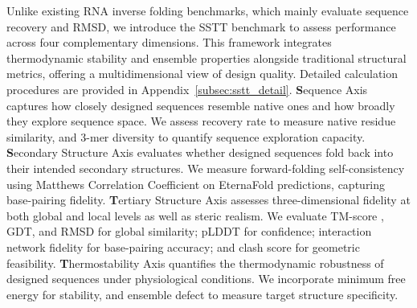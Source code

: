 Unlike existing RNA inverse folding benchmarks, which mainly evaluate sequence recovery and RMSD, we introduce the SSTT benchmark to assess performance across four complementary dimensions. This framework integrates thermodynamic stability and ensemble properties alongside traditional structural metrics, offering a multidimensional view of design quality. Detailed calculation procedures are provided in Appendix~\ref{subsec:sstt_detail}. 
{\textbf{S}equence Axis} captures how closely designed sequences resemble native ones and how broadly they explore sequence space. We assess recovery rate \citep{dauparas2022proteinmpnn} to measure native residue similarity, and 3-mer diversity \citep{shannon1948mathematical,Bokulich2024diversitykmer} to quantify sequence exploration capacity.
{\textbf{S}econdary Structure Axis} evaluates whether designed sequences fold back into their intended secondary structures. We measure forward-folding self-consistency using Matthews Correlation Coefficient \citep{matthews1975comparison,mccmoreaccurate} on EternaFold \citep{waymentsteele2022eternafold} predictions, capturing base-pairing fidelity. 
{\textbf{T}ertiary Structure Axis} assesses three-dimensional fidelity at both global and local levels as well as steric realism. We evaluate TM-score \citep{zhang2004tmscore}, GDT, and RMSD for global similarity; pLDDT \citep{jumper2021alphafold2} for confidence; { interaction network fidelity \citep{parisien2009newmetricsinf} for base-pairing accuracy; and clash score \citep{word1999clashscore,davis2007molprobity} for geometric feasibility.} 
{\textbf{T}hermostability Axis} quantifies the thermodynamic robustness of designed sequences under physiological conditions. We incorporate minimum free energy \citep{zuker1981optimal} for stability, { and ensemble defect \citep{zadeh2011nucleic} to measure target structure specificity.}